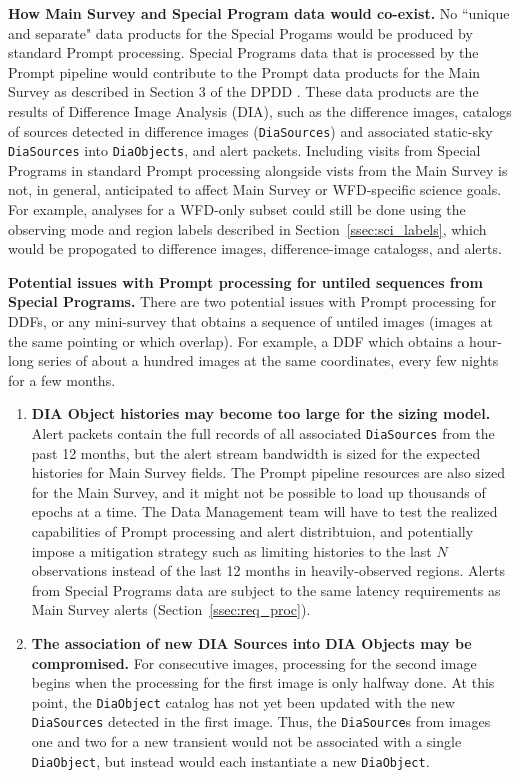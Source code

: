 \textbf{How Main Survey and Special Program data would co-exist.}
No ``unique and separate" data products for the Special Progams would be 
produced by standard Prompt processing.
Special Programs data that is processed by the Prompt pipeline would 
contribute to the Prompt data products for the Main Survey as 
described in Section 3 of the DPDD . 
These data products are the results of Difference Image Analysis (DIA),
such as the difference images, catalogs of sources detected in difference
images ({\tt DiaSources}) and associated static-sky {\tt DiaSources}
into {\tt DiaObjects}, and alert packets.
Including visits from Special Programs in standard Prompt processing alongside
vists from the Main Survey is not, in general, anticipated to affect Main Survey 
or WFD-specific science goals.
For example, analyses for a WFD-only subset could still be done using the observing mode
and region labels described in Section~\ref{ssec:sci_labels}, which would be
propogated to difference images, difference-image catalogss, and alerts.

\textbf{Potential issues with Prompt processing for untiled sequences from Special Programs.}
There are two potential issues with Prompt processing for DDFs, or any mini-survey 
that obtains a sequence of untiled images (images at the same pointing or which overlap).
For example, a DDF which obtains a hour-long series of about a hundred images at the same coordinates,
every few nights for a few months.

\begin{enumerate}

\item \textbf{DIA Object histories may become too large for the sizing model.}
Alert packets contain the full records of all associated 
{\tt DiaSources} from the past 12 months, but the alert
stream bandwidth is sized for the expected histories for
Main Survey fields. 
The Prompt pipeline resources are also sized for the
Main Survey, and it might not be possible to load up
thousands of epochs at a time.
The Data Management team will have to test the realized
capabilities of Prompt processing and alert distribtuion,
and potentially impose a mitigation strategy such as
limiting histories to the last $N$ observations instead
of the last 12 months in heavily-observed regions.
Alerts from Special Programs data are subject to the same latency
requirements as Main Survey alerts (Section~\ref{ssec:req_proc}).

\item \textbf{The association of new DIA Sources into DIA Objects may be compromised.}
For consecutive images, processing for the second image begins when the processing for the 
first image is only halfway done.
At this point, the {\tt DiaObject} catalog has 
not yet been updated with the new {\tt DiaSources} detected in the first image.
Thus, the {\tt DiaSource}s from images one and two for a new transient 
would not be associated with a single {\tt DiaObject}, but instead would 
each instantiate a new {\tt DiaObject}.

\end{enumerate}

